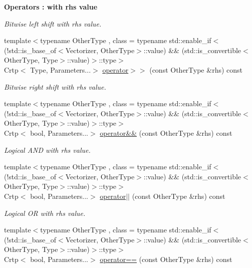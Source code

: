 \begin{Indent}{\bf Operators \-: with rhs value}
\begin{DoxyCompactItemize}
\begin{DoxyCompactList}\small\item\em Bitwise left shift with rhs value. \end{DoxyCompactList}\item 
{\footnotesize template$<$typename Other\-Type , class  = typename std\-::enable\-\_\-if$<$(!std\-::is\-\_\-base\-\_\-of$<$\-Vectorizer, Other\-Type$>$\-::value) \&\& (std\-::is\-\_\-convertible$<$\-Other\-Type, Type$>$\-::value)$>$\-::type$>$ }\\Crtp$<$ Type, Parameters...$>$ \hyperlink{classmagrathea_1_1StaticVectorizer_a3738d5814db16597b32bdf601685c832}{operator$>$$>$} (const Other\-Type \&rhs) const 
\begin{DoxyCompactList}\small\item\em Bitwise right shift with rhs value. \end{DoxyCompactList}\item 
{\footnotesize template$<$typename Other\-Type , class  = typename std\-::enable\-\_\-if$<$(!std\-::is\-\_\-base\-\_\-of$<$\-Vectorizer, Other\-Type$>$\-::value) \&\& (std\-::is\-\_\-convertible$<$\-Other\-Type, Type$>$\-::value)$>$\-::type$>$ }\\Crtp$<$ bool, Parameters...$>$ \hyperlink{classmagrathea_1_1StaticVectorizer_a96cdf853407901fedc50265a84fa5991}{operator\&\&} (const Other\-Type \&rhs) const 
\begin{DoxyCompactList}\small\item\em Logical A\-N\-D with rhs value. \end{DoxyCompactList}\item 
{\footnotesize template$<$typename Other\-Type , class  = typename std\-::enable\-\_\-if$<$(!std\-::is\-\_\-base\-\_\-of$<$\-Vectorizer, Other\-Type$>$\-::value) \&\& (std\-::is\-\_\-convertible$<$\-Other\-Type, Type$>$\-::value)$>$\-::type$>$ }\\Crtp$<$ bool, Parameters...$>$ \hyperlink{classmagrathea_1_1StaticVectorizer_afed99ecd4a86f62923433c8f27a05d3f}{operator$|$$|$} (const Other\-Type \&rhs) const 
\begin{DoxyCompactList}\small\item\em Logical O\-R with rhs value. \end{DoxyCompactList}\item 
{\footnotesize template$<$typename Other\-Type , class  = typename std\-::enable\-\_\-if$<$(!std\-::is\-\_\-base\-\_\-of$<$\-Vectorizer, Other\-Type$>$\-::value) \&\& (std\-::is\-\_\-convertible$<$\-Other\-Type, Type$>$\-::value)$>$\-::type$>$ }\\Crtp$<$ bool, Parameters...$>$ \hyperlink{classmagrathea_1_1StaticVectorizer_ae8a3d25716fb6f3056a194db4611398b}{operator==} (const Other\-Type \&rhs) const 

\end{DoxyCompactItemize}
\end{Indent}
